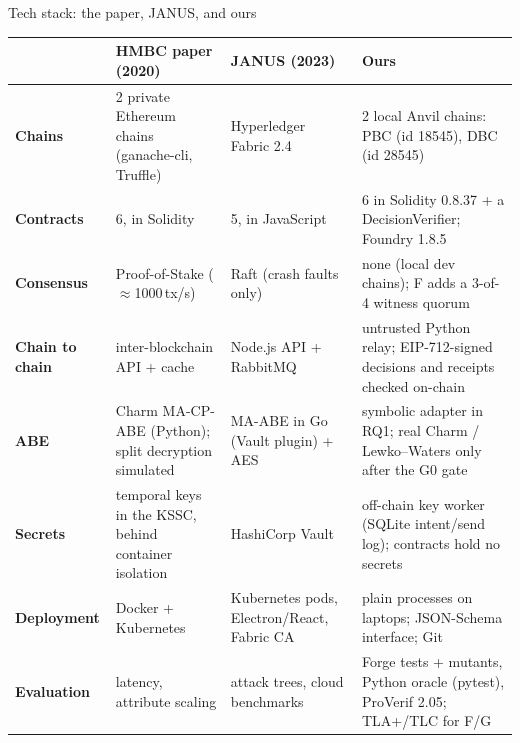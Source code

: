 \documentclass[aspectratio=169,10pt]{beamer}
\begin{document}
\begin{frame}{Tech stack: the paper, JANUS, and ours}
\scriptsize
\renewcommand{\arraystretch}{1.18}
\begin{tabular}{@{}>{\bfseries}L{0.13\textwidth} L{0.24\textwidth} L{0.24\textwidth} >{}L{0.33\textwidth}@{}}
\toprule
 & \textbf{HMBC paper (2020)} & \textbf{JANUS (2023)} & \textbf{Ours} \\
\midrule
Chains & 2 private Ethereum chains (ganache-cli, Truffle) & Hyperledger Fabric 2.4 & 2 local Anvil chains: PBC (id 18545), DBC (id 28545) \\
Contracts & 6, in Solidity & 5, in JavaScript & 6 in Solidity 0.8.37 + a DecisionVerifier; Foundry 1.8.5 \\
Consensus & Proof-of-Stake ($\approx$1000\,tx/s) & Raft (crash faults only) & none (local dev chains); F adds a 3-of-4 witness quorum \\
Chain to chain & inter-blockchain API + cache & Node.js API + RabbitMQ & untrusted Python relay; EIP-712-signed decisions and receipts checked on-chain \\
ABE & Charm MA-CP-ABE (Python); split decryption simulated & MA-ABE in Go (Vault plugin) + AES & symbolic adapter in RQ1; real Charm / Lewko–Waters only after the G0 gate \\
Secrets & temporal keys in the KSSC, behind container isolation & HashiCorp Vault & off-chain key worker (SQLite intent/send log); contracts hold no secrets \\
Deployment & Docker + Kubernetes & Kubernetes pods, Electron/React, Fabric CA & plain processes on laptops; JSON-Schema interface; Git \\
Evaluation & latency, attribute scaling & attack trees, cloud benchmarks & Forge tests + mutants, Python oracle (pytest), ProVerif 2.05; TLA+/TLC for F/G \\
\bottomrule
\end{tabular}
\end{frame}
\end{document}
